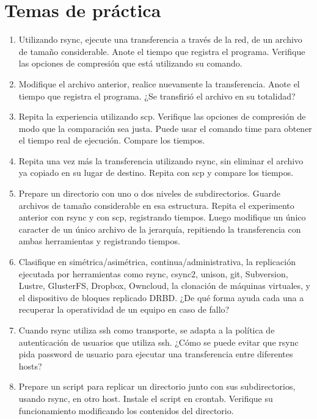 \section{Temas de práctica}
\begin{enumerate}
	\item Utilizando rsync, ejecute una transferencia a través de la red, de un archivo de tamaño considerable. Anote el tiempo que registra el programa. Verifique las opciones de compresión que está utilizando su comando.
	\item Modifique el archivo anterior, realice nuevamente la transferencia. Anote el tiempo que registra el programa. ¿Se transfirió el archivo en su totalidad?
	\item Repita la experiencia utilizando scp. Verifique las opciones de compresión de modo que la comparación sea justa. Puede usar el comando time para obtener el tiempo real de ejecución. Compare los tiempos. 
	\item Repita una vez más la transferencia utilizando rsync, sin eliminar el archivo ya copiado en su lugar de destino. Repita con scp y compare los tiempos.
	\item Prepare un directorio con uno o dos niveles de subdirectorios. Guarde archivos de tamaño considerable en esa estructura. Repita el experimento anterior con rsync y con scp, registrando tiempos. Luego modifique un único caracter de un único archivo de la jerarquía, repitiendo la transferencia con ambas herramientas y registrando tiempos.
	\item Clasifique en simétrica/asimétrica, continua/administrativa, la replicación ejecutada por herramientas como rsync, csync2, unison, git, Subversion, Lustre, GlusterFS, Dropbox, Owncloud, la clonación de máquinas virtuales, y el dispositivo de bloques replicado DRBD. ¿De qué forma ayuda cada una a recuperar la operatividad de un equipo en caso de fallo?	
	\item Cuando rsync utiliza ssh como transporte, se adapta a la política de autenticación de usuarios que utiliza ssh. ¿Cómo se puede evitar que rsync pida password de usuario para ejecutar una transferencia entre diferentes hosts?
	\item Prepare un script para replicar un directorio junto con sus subdirectorios, usando rsync, en otro host. Instale el script en crontab. Verifique su funcionamiento modificando los contenidos del directorio.

\end{enumerate}
